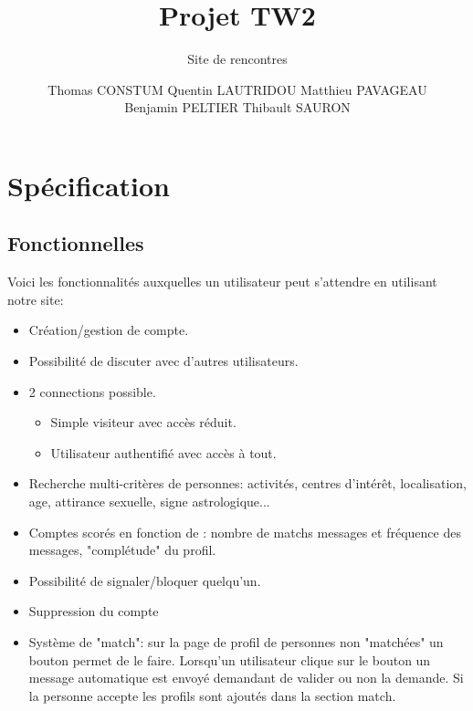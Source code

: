 \documentclass{scrartcl}
\begin{document}
\title{Projet TW2}
\subtitle{Site de rencontres}
\author{Thomas CONSTUM Quentin LAUTRIDOU Matthieu PAVAGEAU\\Benjamin PELTIER Thibault SAURON\\}
\maketitle

\tableofcontents

\newpage

\section{Spécification}
    
    \subsection{Fonctionnelles}
        Voici les fonctionnalités auxquelles un utilisateur peut s'attendre en utilisant notre site:
        \begin{itemize}
            \item Création/gestion de compte.
            \item Possibilité de discuter avec d'autres utilisateurs.
            \item 2 connections possible.
            \begin{itemize}
                \item Simple visiteur avec accès réduit.
                \item Utilisateur authentifié avec accès à tout.
            \end{itemize}
            \item Recherche multi-critères de personnes: activités, centres d'intérêt, localisation, age, attirance sexuelle, signe astrologique...
            \item Comptes scorés en fonction de : nombre de matchs messages et fréquence des messages, "complétude" du profil.
            \item Possibilité de signaler/bloquer quelqu'un.
            \item Suppression du compte
            \item Système de "match": sur la page de profil de personnes non "matchées" un bouton permet de le faire. Lorsqu'un utilisateur clique sur le bouton un message automatique est envoyé demandant de valider ou non la demande. Si la personne accepte les profils sont ajoutés dans la section match.
        \end{itemize}
\end{document}
